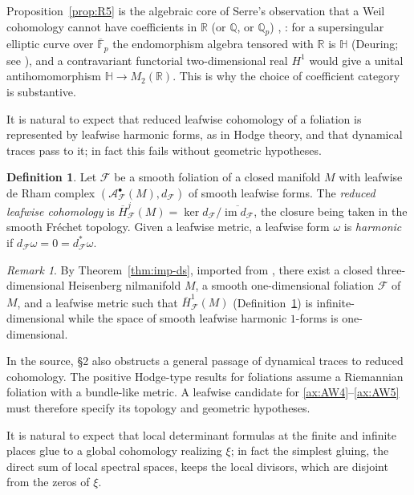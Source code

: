 \documentclass[11pt]{amsart}
\theoremstyle{plain}
\theoremstyle{definition}
\newtheorem{definition}[theorem]{Definition}
\theoremstyle{remark}
\newtheorem{remark}[theorem]{Remark}
\numberwithin{equation}{section}
\newcommand{\R}{\mathbb{R}}
\newcommand{\Q}{\mathbb{Q}}
\newcommand{\F}{\mathbb{F}}
\begin{document}
Proposition~\ref{prop:R5} is the algebraic core of Serre's observation
that a Weil cohomology cannot have coefficients in $\R$ (or $\Q$, or
$\Q_p$) \cite[(2.2) and fn.~25, p.~27]{Milne2016RHFF},
\cite[\S1, p.~1]{Deninger2022NoWeil}: for a supersingular
elliptic curve over $\overline{\F}_p$ the endomorphism algebra tensored
with $\R$ is $\mathbb H$ (Deuring; see
\cite[Theorem~V.3.1, pp.~144--145]{Silverman2009AEC}), and a
contravariant functorial two-dimensional real $H^1$ would give a unital
antihomomorphism $\mathbb H\to M_2(\R)$. This is why the choice of
coefficient category is substantive.

It is natural to expect that reduced leafwise cohomology of a foliation
is represented by leafwise harmonic forms, as in Hodge theory, and that
dynamical traces pass to it; in fact this fails without geometric
hypotheses.

\begin{definition}\label{def:reduced-leafwise}
Let $\mathcal F$ be a smooth foliation of a closed manifold $M$ with
leafwise de Rham complex $(\mathcal A^\bullet_{\mathcal F}(M),
d_{\mathcal F})$ of smooth leafwise forms. The \emph{reduced leafwise
cohomology} is $\overline H^j_{\mathcal F}(M)=\ker d_{\mathcal F}/
\overline{\operatorname{im}d_{\mathcal F}}$, the closure being taken in
the smooth Fr\'echet topology. Given a leafwise metric, a leafwise form
$\omega$ is \emph{harmonic} if $d_{\mathcal F}\omega=0=d_{\mathcal
F}^*\omega$.
\end{definition}

\begin{remark}\label{rem:R6}
By Theorem~\ref{thm:imp-ds}, imported from
\cite[Proposition~1.2 and~(12), p.~214]%
{DeningerSinghof2001Counterexample}, there exist a closed
three-dimensional Heisenberg nilmanifold $M$, a smooth one-dimensional
foliation $\mathcal F$ of $M$, and a leafwise metric such that
$\overline H^1_{\mathcal F}(M)$
(Definition~\ref{def:reduced-leafwise}) is infinite-dimensional while
the space of smooth leafwise harmonic $1$-forms is one-dimensional.
\end{remark}

In the source, \S2 also
obstructs a general passage of dynamical traces to reduced cohomology.
The positive Hodge-type results for foliations assume a Riemannian
foliation with a bundle-like metric. A leafwise candidate for
\ref{ax:AW4}--\ref{ax:AW5} must therefore specify its topology and
geometric hypotheses.

It is natural to expect that local determinant formulas at the finite
and infinite places glue to a global cohomology realizing $\xi$; in fact
the simplest gluing, the direct sum of local spectral spaces, keeps the
local divisors, which are disjoint from the zeros of $\xi$.
\end{document}
